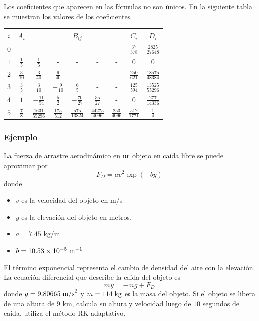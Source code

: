 \begin{frame}
Los coeficientes que aparecen en las fórmulas no son únicos. En la siguiente tabla se muestran los valores de los coeficientes.
\begin{tabular}{| c | c | c c c c c | c | c |}
\hline
$i$ & $A_{i}$ & & & $B_{ij}$ & & & $C_{i}$ & $D_{i}$ \\ \hline
$0$ & - & - & - & - & - & - &  $\frac{37}{378}$ & $\frac{2825}{27648}$ \\ \hline
$1$ & $\frac{1}{5}$ & $\frac{1}{5}$ & - & - & - & - &  $0$ & $0$ \\ \hline
$2$ & $\frac{3}{10}$ & $\frac{3}{40}$ & $\frac{9}{40}$ & - & - & - &  $\frac{250}{621}$ & $\frac{18575}{48384}$ \\ \hline
$3$ & $\frac{3}{5}$ & $\frac{3}{10}$ & $-\frac{9}{10}$ & $\frac{6}{5}$ & - & - &  $\frac{125}{594}$ & $\frac{13525}{55296}$ \\ \hline
$4$ & $1$ & $-\frac{11}{54}$ & $\frac{5}{2}$ & $-\frac{70}{27}$ & $\frac{35}{27}$ & - &  $0$ & $\frac{277}{14336}$ \\ \hline
$5$ & $\frac{7}{8}$ & $\frac{1631}{55296}$ & $\frac{175}{512}$ & $\frac{575}{13824}$ & $\frac{44275}{4096}$ & $\frac{253}{4096}$ &  $\frac{512}{1771}$ & $\frac{1}{4}$ \\ \hline
\end{tabular}
\end{frame}
\begin{frame}
\frametitle{Ejemplo}
La fuerza de arrastre aerodinámico en un objeto en caída libre se puede aproximar por
\[ F_{D} = av^{2} \exp(-by) \]
donde
\begin{itemize}
\item $v$ es la velocidad del objeto en m/s
\item $y$ es la elevación del objeto en metros.
\item $a=7.45$ kg/m
\item $b= 10.53 \times 10^{-5} \hspace{0.1cm} \mbox{m}^{-1}$
\end{itemize}
\end{frame}
\begin{frame}
El término exponencial representa el cambio de densidad del aire con la elevación. La ecuación diferencial que describe la caída del objeto es
\[ m \ddot{y} = -mg + F_{D} \]
donde $g=9.80665 \hspace{0.1cm} \mbox{m/s}^{2}$ y $m=114 \hspace{0.1cm} \mbox{kg}$ es la masa del objeto. Si el objeto se libera de una altura de $9$ km, calcula su altura y velocidad luego de $10$ segundos de caída, utiliza el método RK adaptativo.
\end{frame}
